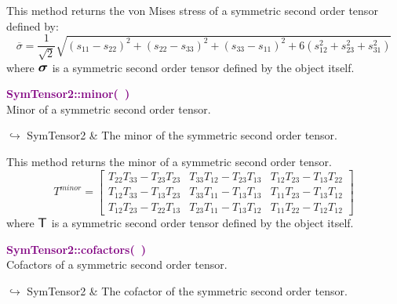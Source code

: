 This method returns the von Mises stress of a symmetric second order tensor defined by:
\begin{equation*}
\overline{\sigma} = \frac {1}{\sqrt{2}}\sqrt{(s_{11}-s_{22})^2+(s_{22}-s_{33})^2+(s_{33}-s_{11})^2+6(s_{12}^2+s_{23}^2+s_{31}^2)}
\end{equation*}
where $\mbox{\large\ensuremath{\boldsymbol{\sigma}}}$ is a symmetric second order tensor defined by the object itself.

\textcolor{purple}{\textbf{SymTensor2::minor(~)}}\label{SymTensor2::minor()}\\
Minor of a symmetric second order tensor.\vspace*{-0.5em}
\begin{tcolorbox}[grow to left by=-1cm, width=\textwidth-1cm,myArgs,tabularx={l|R}]
$\hookrightarrow$ SymTensor2 & The minor of the symmetric second order tensor.
\end{tcolorbox}

This method returns the minor of a symmetric second order tensor.
\begin{equation*}
T^{minor} = \left[\begin{array}{ccc}
T_{22}T_{33}-T_{23}T_{23} & T_{33}T_{12}-T_{23}T_{13} & T_{12}T_{23}-T_{13}T_{22}\\
T_{12}T_{33}-T_{13}T_{23} & T_{33}T_{11}-T_{13}T_{13} & T_{11}T_{23}-T_{13}T_{12}\\
T_{12}T_{23}-T_{22}T_{13} & T_{23}T_{11}-T_{13}T_{12} & T_{11}T_{22}-T_{12}T_{12}
\end{array}
\right]
\end{equation*}
where $\mbox{\large\ensuremath{\mathsf{T}}}$ is a symmetric second order tensor defined by the object itself.

\textcolor{purple}{\textbf{SymTensor2::cofactors(~)}}\label{SymTensor2::cofactors()}\\
Cofactors of a symmetric second order tensor.\vspace*{-0.5em}
\begin{tcolorbox}[grow to left by=-1cm, width=\textwidth-1cm,myArgs,tabularx={l|R}]
$\hookrightarrow$ SymTensor2 & The cofactor of the symmetric second order tensor.
\end{tcolorbox}

